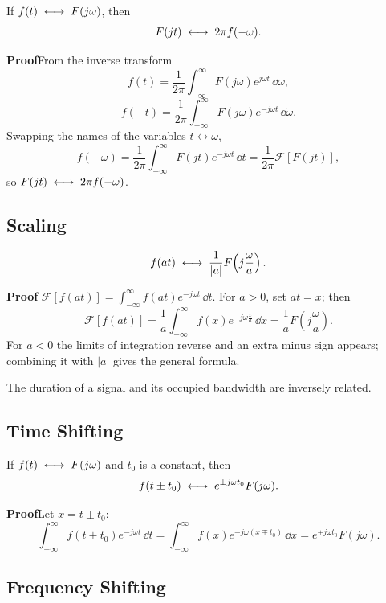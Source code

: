 If $f(t)\;\longleftrightarrow\; F(j\omega)$, then
\[
    F(jt)\;\longleftrightarrow\; 2\pi f(-\omega).
\]

\begin{note}
\textbf{Proof}\quad From the inverse transform
\[
    f(t)=\frac{1}{2\pi}\int_{-\infty}^{\infty}F(j\omega)e^{j\omega t}\,\dd\omega,
\]
\[
    f(-t)=\frac{1}{2\pi}\int_{-\infty}^{\infty}F(j\omega)e^{-j\omega t}\,\dd\omega .
\]
Swapping the names of the variables $t\leftrightarrow\omega$,
\[
    f(-\omega)=\frac{1}{2\pi}\int_{-\infty}^{\infty}F(jt)e^{-j\omega t}\,\dd t
    =\frac{1}{2\pi}\mathcal{F}[F(jt)],
\]
so $F(jt)\;\longleftrightarrow\; 2\pi f(-\omega)$.
\end{note}

\subsection{Scaling}

\[
    f(at)\;\longleftrightarrow\; \frac{1}{|a|}F\!\left(j\frac{\omega}{a}\right).
\]

\begin{note}
\textbf{Proof}\quad
$\mathcal{F}[f(at)]=\displaystyle\int_{-\infty}^{\infty}f(at)e^{-j\omega t}\,\dd t$.
For $a>0$, set $at=x$; then
\[
    \mathcal{F}[f(at)]=\frac{1}{a}\int_{-\infty}^{\infty}f(x)e^{-j\omega\frac{x}{a}}\,\dd x
    =\frac{1}{a}F\!\left(j\frac{\omega}{a}\right).
\]
For $a<0$ the limits of integration reverse and an extra minus sign appears;
combining it with $|a|$ gives the general formula.
\end{note}

The duration of a signal and its occupied bandwidth are inversely related.

\subsection{Time Shifting}

If $f(t)\;\longleftrightarrow\; F(j\omega)$ and $t_0$ is a constant, then
\[
    f(t\pm t_0)\;\longleftrightarrow\; e^{\pm j\omega t_0}F(j\omega).
\]

\begin{note}
\textbf{Proof}\quad Let $x=t\pm t_0$:
\[
    \int_{-\infty}^{\infty}f(t\pm t_0)e^{-j\omega t}\,\dd t
    =\int_{-\infty}^{\infty}f(x)e^{-j\omega(x\mp t_0)}\,\dd x
    =e^{\pm j\omega t_0}F(j\omega).
\]
\end{note}

\subsection{Frequency Shifting}

